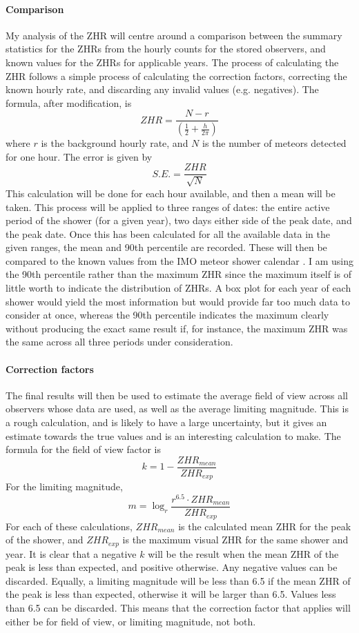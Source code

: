 \paragraph{Comparison\\}
My analysis of the ZHR will centre around a comparison between the summary statistics for the ZHRs from the hourly counts for the stored observers, and known values for the ZHRs for applicable years. The process of calculating the ZHR follows a simple process of calculating the correction factors, correcting the known hourly rate, and discarding any invalid values (e.g. negatives). The formula, after modification, is
\[ {ZHR} = \frac{N - r}{\left( \frac{1}{2} + \frac{h}{2\pi} \right)} \]
where $r$ is the background hourly rate, and $N$ is the number of meteors detected for one hour. The error is given by
\[ {S.E.} = \frac{{ZHR}}{\sqrt{N}}\]
This calculation will be done for each hour available, and then a mean will be taken. This process will be applied to three ranges of dates: the entire active period of the shower (for a given year), two days either side of the peak date, and the peak date. Once this has been calculated for all the available data in the given ranges, the mean and 90th percentile are recorded. These will then be compared to the known values from the IMO meteor shower calendar \cite{imo_meteor_calendar}. I am using the 90th percentile rather than the maximum ZHR since the maximum itself is of little worth to indicate the distribution of ZHRs. A box plot for each year of each shower would yield the most information but would provide far too much data to consider at once, whereas the 90th percentile indicates the maximum clearly without producing the exact same result if, for instance, the maximum ZHR was the same across all three periods under consideration. 
\paragraph{Correction factors\\}
The final results will then be used to estimate the average field of view across all observers whose data are used, as well as the average limiting magnitude. This is a rough calculation, and is likely to have a large uncertainty, but it gives an estimate towards the true values and is an interesting calculation to make. The formula for the field of view factor is
\[ k = 1 - \frac{{ZHR}_{mean}}{{ZHR}_{exp}} \]
For the limiting magnitude,
\[ m =  \log_r \frac{r^{6.5} \cdot {ZHR}_{mean}}{{ZHR}_{exp}} \]
For each of these calculations, $ZHR_{mean}$ is the calculated mean ZHR for the peak of the shower, and $ZHR_{exp}$ is the maximum visual ZHR for the same shower and year.
It is clear that a negative $k$ will be the result when the mean ZHR of the peak is less than expected, and positive otherwise. Any negative values can be discarded. Equally, a limiting magnitude will be less than 6.5 if the mean ZHR of the peak is less than expected, otherwise it will be larger than 6.5. Values less than 6.5 can be discarded. This means that the correction factor that applies will either be for field of view, or limiting magnitude, not both.
